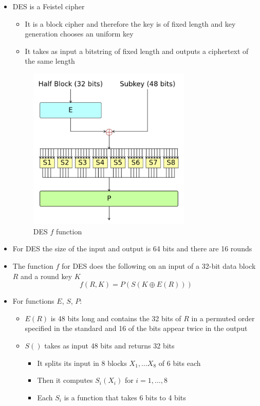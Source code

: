 \begin{itemize}
  \item DES is a Feistel cipher
  \begin{itemize}
  	\item It is a block cipher and therefore the key is of fixed length and key generation chooses an uniform key
  	\item It takes as input a bitstring of fixed length and outputs a ciphertext of the same length
  \end{itemize}
  \begin{figure}[H]
    \centering
    \includegraphics[width=220pt]{img/symmetric_cryptosystems/des_f_function}
    \caption{DES $f$ function}
  \end{figure}
  \item For DES the size of the input and output is 64 bits and there are 16 rounds
  \item The function $f$ for DES does the following on an input of a 32-bit data block $R$ and a round key $K$
  \begin{equation*}
    f(R,K) = P(S(K \oplus E(R)))
  \end{equation*}
  \item For functions $E$, $S$, $P$:
  \begin{itemize}
  	\item $E(R)$ is 48 bits long and contains the 32 bits of $R$ in a permuted order specified in the standard and 16 of the bits appear twice in the output
  	\item $S()$ takes as input 48 bits and returns 32 bits
    \begin{itemize}
  		\item It splits its input in 8 blocks $X_1, \dots X_8$ of 6 bits each
  		\item Then it computes $S_i(X_i)$ for $i=1, \dots,8$
  		\item Each $S_i$ is a function that takes 6 bits to 4 bits

\end{itemize}
\end{itemize}
\end{itemize}
